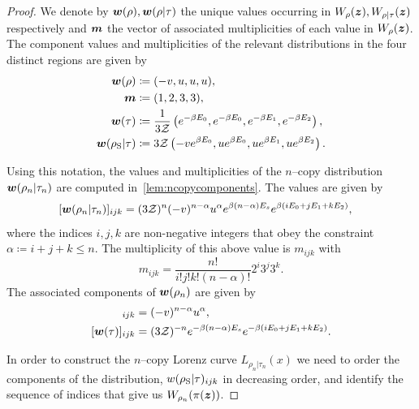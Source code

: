 \documentclass[pra,
aps,
twocolumn,
superscriptaddress,
groupedaddress,
nofootinbib,
reprint
]{revtex4-1}
\begin{document}
\begin{proof}
We denote by $\boldsymbol{w}(\rho), \boldsymbol{w}(\rho|\tau)$ the unique values occurring in $W_\rho(\bm{z}), W_{\rho|\tau}(\bm{z})$ respectively and $\bm{m}$ the vector of associated multiplicities of each value in $W_\rho(\bm{z})$. The component values and multiplicities of the relevant distributions in the four distinct regions are given by
\begin{align}
	\boldsymbol{w}(\rho) &\coloneqq (-v, u, u, u), \\
		\bm{m} &\coloneqq (1,2,3,3), \\
	\boldsymbol{w}(\tau) &\coloneqq \frac{1}{3\mathcal{Z}} \left( e^{-\beta E_0}, e^{-\beta E_0}, e^{-\beta E_1}, e^{-\beta E_2} \right), \\
	\boldsymbol{w}(\rho_{\rm{S}} | \tau) &\coloneqq 3\mathcal{Z} \left( -v e^{\beta E_0}, u e^{\beta E_0}, u e^{\beta E_1}, u e^{\beta E_2} \right). \label{eq:bmw_rescaled}
\end{align}

Using this notation, the values and multiplicities of the $n$--copy distribution $\bm{w}(\rho_n |\tau_n)$ are computed in~\cref{lem:ncopycomponents}. The values are given by 
\begin{align}\label{eq:ncopy_w_rescaled}
	[\boldsymbol{w}(\rho_n | \tau_n)]_{ijk} &= (3\mathcal{Z})^{n} (-v)^{n-\alpha} u^{\alpha} e^{\beta (n-\alpha)E_s} e^{\beta ( i E_0 + j E_1 + k E_2 )},
\end{align}
where the indices $i,j,k$ are non-negative integers that obey the constraint $\alpha \coloneqq i+j+k \leq n$.
The multiplicity of this above value is $m_{ijk}$ with
\begin{equation}
	m_{ijk} = \frac{n!}{i!j!k!(n-\alpha)!} 2^i 3^j 3^k.
\end{equation}
The associated components of $\boldsymbol{w}(\rho_n)$ are given by
\begin{align}
	[\w(\rho_n)]_{ijk} &= (-v)^{n-\alpha} u^{\alpha}, \label{eq:ncopy_wrho}\\
	[\w(\tau)]_{ijk} &= (3\Z)^{-n} e^{-\beta (n-\alpha)E_s} e^{-\beta ( i E_0 + j E_1 + k E_2 )}. \label{eq:ncopy_wsigma}
\end{align}

In order to construct the $n$--copy Lorenz curve $L_{\rho_n|\tau_n}(x)$ we need to order the components of the distribution, $w(\rho_{\rm{S}} | \tau)_{ijk}$ in decreasing order, and identify the sequence of indices that give us $W_{\rho_n}(\pi(\bm{z}))$.


\end{proof}
\end{document}
